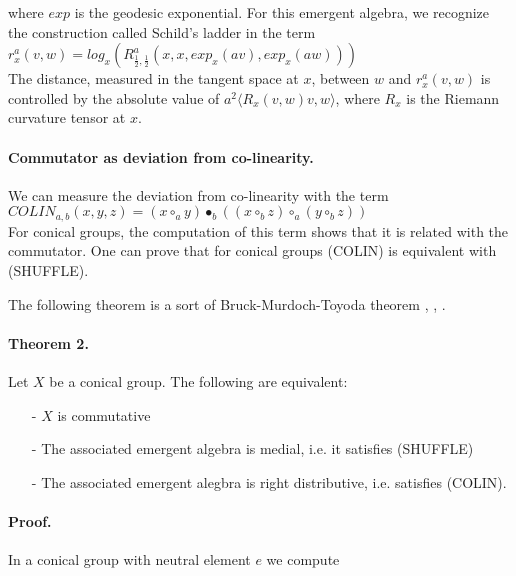 \documentclass{article}
\begin{document}
\noindent where $exp$ is the geodesic exponential. For this emergent algebra, we recognize the construction called Schild's ladder in the term  \\ 

$\displaystyle r^{a}_{x}(v,w) = log_{x} \left( R^{a}_{\frac{1}{2}, \frac{1}{2}}(x,x, exp_{x}(av), exp_{x}(aw)) \right)$ \\ 

The distance, measured in the tangent space at $x$, between $w$ and $\displaystyle r^{a}_{x}(v,w)$ is controlled by the absolute value of $\displaystyle a^{2} \langle R_{x}(v,w)v,w\rangle$, where $\displaystyle R_{x}$ is the Riemann curvature tensor at $x$. 





\paragraph{Commutator as deviation from co-linearity.} We can measure the deviation from co-linearity with the term \\

$\displaystyle COLIN_{a,b}(x,y,z) =  (x \circ_{a} y) \bullet_{b} ((x \circ_{b} z) \circ_{a} (y \circ_{b} z))$ \\

For conical groups, the computation of this term shows that it is related with the commutator.  One can prove that for conical groups (COLIN) is equivalent with (SHUFFLE). 

The following theorem is a sort of Bruck-Murdoch-Toyoda theorem \cite{toyoda}, \cite{murdoch}, \cite{bruck}. 

\paragraph{Theorem 2.} Let $X$ be a conical group. The following are equivalent:
\begin{enumerate}
\item[-] $X$ is commutative

\item[-] The associated emergent algebra is medial, i.e. it satisfies (SHUFFLE) 

\item[-] The associated emergent alegbra is right distributive, i.e. satisfies (COLIN).   
\end{enumerate}

\paragraph{Proof.} In a conical group with neutral element $e$ we compute 
\end{document}
